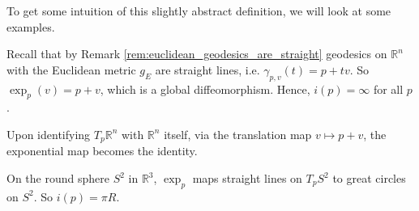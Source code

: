 To get some intuition of this slightly abstract definition, we will look at some examples.


\begin{colexample}{}{}
Recall that by Remark \ref{rem:euclidean_geodesics_are_straight} geodesics on $\mathbb{R}^n$ with the Euclidean metric $g_E$ are straight lines, i.e. $\gamma_{p,v}(t) = p + tv$. So $\exp_p(v) = p + v$, which is a global diffeomorphism. Hence, $i(p) = \infty$ for all $p$.

Upon identifying $T_p \mathbb{R}^n$ with $\mathbb{R}^n$ itself, via the translation map $v \mapsto p + v$, the exponential map becomes the identity.
\end{colexample}

\begin{colexample}{}{}
On the round sphere $S^2$ in $\mathbb{R}^3$, $\exp_p$ maps straight lines on $T_p S^2$ to great circles on $S^2$. So $i(p) = \pi R$.
\end{colexample}


